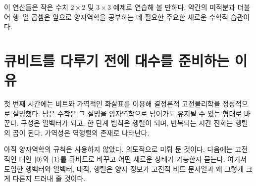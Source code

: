 이 연산들은 작은 수치 \(2\times2\) 및 \(3\times3\) 예제로 연습해 볼 만하다. 약간의 미적분과 더불어 행--열 곱셈은 앞으로 양자역학을 공부하는 데 필요한 주요한 새로운 수학적 습관이다.

\begin{classroomqa}
\end{classroomqa}

\section{큐비트를 다루기 전에 대수를 준비하는 이유}

첫 번째 시간에는 비트와 가역적인 화살표를 이용해 결정론적 고전물리학을 정성적으로 설명했다. 남은 수학은 그 설명을 양자역학으로 넘어가도 유지될 수 있는 형태로 바꾼다. 구성은 열벡터가 되고, 한 단계 법칙은 행렬이 되며, 반복되는 시간 진화는 행렬의 곱이 된다. 가역성은 역행렬의 존재로 나타난다.

아직 양자역학의 규칙은 사용하지 않았다. 의도적으로 미뤄 둔 것이다. 다음에는 고전적인 대안 \(\left\lvert0\right\rangle\)와 \(\left\lvert1\right\rangle\)를 큐비트로 바꾸고 어떤 새로운 상태가 가능한지 묻는다. 여기서 도입한 행벡터와 열벡터, 내적, 행렬은 양자 정보가 고전적 비트 문자열과 왜 그렇게 크게 다른지 드러내 줄 것이다.

\begin{classroomqa}
\end{classroomqa}
